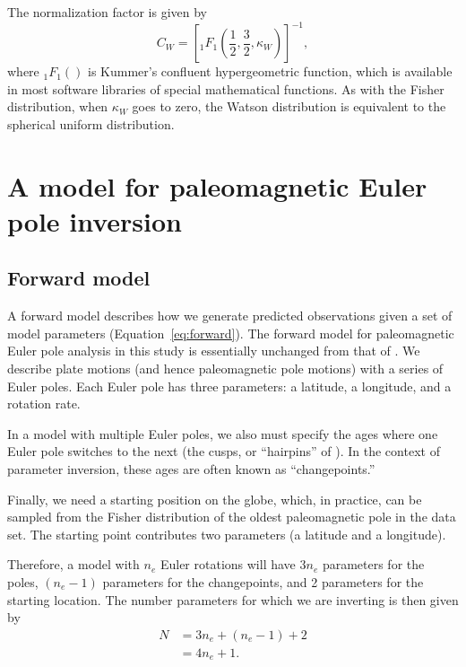 \documentclass[11pt,letterpaper]{article}
\begin{document}
The normalization factor is given by
\begin{equation}
  C_W = \left[ {}_1 F_1 \left( \frac{1}{2}, \frac{3}{2}, \kappa_W \right) \right]^{-1},
\end{equation}
where ${}_1 F_1()$ is Kummer's confluent hypergeometric function, which is available in most software libraries of special mathematical functions. As with the Fisher distribution, when $\kappa_W$ goes to zero,  the Watson distribution is equivalent to the spherical uniform distribution.

\section*{A model for paleomagnetic Euler pole inversion}
\label{sec:model}
\subsection*{Forward model}
\label{sec:forward_model}
A forward model describes how we generate predicted observations given a set of model parameters (Equation~\eqref{eq:forward}). The forward model for paleomagnetic Euler pole analysis in this study is essentially unchanged from that of \cite{Gordon1984a}. We describe plate motions (and hence paleomagnetic pole motions) with a series of Euler poles. Each Euler pole has three parameters: a latitude, a longitude, and a rotation rate.

In a model with multiple Euler poles, we also must specify the ages where one Euler pole switches to the next (the cusps, or ``hairpins'' of \cite{Irving1972a}). In the context of parameter inversion, these ages are often known as ``changepoints.''

Finally, we need a starting position on the globe, which, in practice, can be sampled from the Fisher distribution of the oldest paleomagnetic pole in the data set. The starting point contributes two parameters (a latitude and a longitude).

Therefore, a model with $n_e$ Euler rotations will have $3 n_e$ parameters for the poles, $(n_e-1)$ parameters for the changepoints, and 2 parameters for the starting location. The number parameters for which we are inverting is then given by
\begin{equation}
\begin{aligned}
N &= 3 n_e + (n_e -1) + 2 \\
 &= 4 n_e + 1.
\end{aligned}
\label{eq:n_parameters}
\end{equation}
\end{document}
